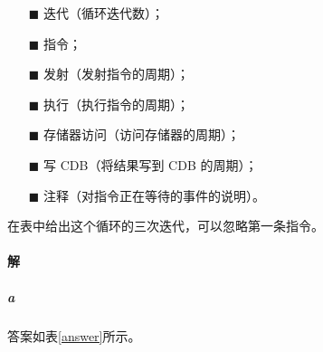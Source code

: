 \documentclass{article}
\begin{document}
\begin{enumerate}[]
    \item[$\blacksquare$] 迭代（循环迭代数）；
    \item[$\blacksquare$] 指令；
    \item[$\blacksquare$] 发射（发射指令的周期）；
    \item[$\blacksquare$] 执行（执行指令的周期）；
    \item[$\blacksquare$] 存储器访问（访问存储器的周期）；
    \item[$\blacksquare$] 写 CDB（将结果写到 CDB 的周期）；
    \item[$\blacksquare$] 注释（对指令正在等待的事件的说明）。
\end{enumerate}
在表中给出这个循环的三次迭代，可以忽略第一条指令。

\paragraph{解}
\subparagraph{a} 答案如表\ref{answer}所示。
\end{document}
